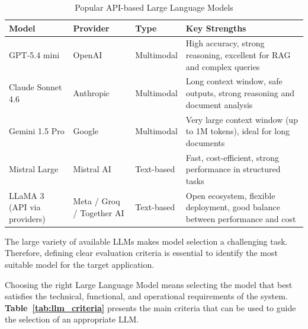 \begin{table}[H]
\centering
\caption{Popular API-based Large Language Models}
\label{tab:llm_popular}
\begin{tabular}{|p{4cm}|p{3cm}|p{3cm}|p{5cm}|}
\hline
\textbf{Model} & \textbf{Provider} & \textbf{Type} & \textbf{Key Strengths} \\
\hline

GPT-5.4 mini & OpenAI & Multimodal &
High accuracy, strong reasoning, excellent for RAG and complex queries \cite{openai} \\
\hline

Claude Sonnet 4.6 & Anthropic & Multimodal &
Long context window, safe outputs, strong reasoning and document analysis \cite{anthropic} \\
\hline

Gemini 1.5 Pro & Google & Multimodal &
Very large context window (up to 1M tokens), ideal for long documents \cite{google_gemini} \\
\hline

Mistral Large & Mistral AI & Text-based &
Fast, cost-efficient, strong performance in structured tasks \cite{mistral} \\
\hline

LLaMA 3 (API via providers) & Meta / Groq / Together AI & Text-based &
Open ecosystem, flexible deployment, good balance between performance and cost \cite{llama3} \\
\hline

\end{tabular}
\end{table}

The large variety of available LLMs makes model selection a challenging task.
Therefore, defining clear evaluation criteria is essential to identify the
most suitable model for the target application.



Choosing the right Large Language Model means selecting the model that best
satisfies the technical, functional, and operational requirements of the system.
\textbf{Table~\ref{tab:llm_criteria}} presents the main criteria that can be used to
guide the selection of an appropriate LLM.

